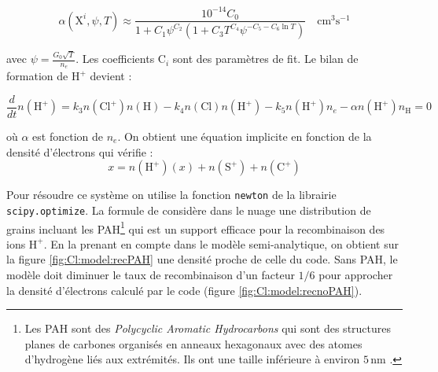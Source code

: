 \begin{equation}
    \alpha \left(\mathrm{X}^{i}, \psi, T\right) \approx \frac{10^{-14} C_{0} }{1+C_{1} \psi^{C_{2}}\left(1+C_{3} T^{C_{4}} \psi^{-C_{5}-C_{6} \ln T}\right)} \quad \mathrm{cm}^{3} \mathrm{s}^{-1}
\end{equation}

avec $\psi = \frac{G_0 \sqrt{T}}{n_e}$. Les coefficients $\mathrm{C}_i$ sont des paramètres de fit. Le bilan de formation de $\mathrm{H}^+$ devient : 

\begin{equation}\label{eq:h+}
    \frac{d}{dt}n(\mathrm{H}^+) = k_3n(\mathrm{Cl}^+)n(\mathrm{H}) - k_4n(\mathrm{Cl})n(\mathrm{H}^+) - k_5 n(\mathrm{H}^+)n_e -\alpha n(\mathrm{H}^+)n_{\mathrm{H}} = 0
\end{equation}

où $\alpha$ est fonction de $n_e$. On obtient une équation implicite en fonction de la densité d'électrons qui vérifie :
\begin{equation}
    x = n(\mathrm{H}^+)(x) + n(\mathrm{S}^+)  + n(\mathrm{C}^+)
\end{equation}

Pour résoudre ce système on utilise la fonction \texttt{newton} de la librairie \texttt{scipy.optimize}. La formule de \cite{Weingartner_2001} considère dans le nuage une distribution de grains incluant les PAH\footnote{Les PAH sont des \textit{Polycyclic Aromatic Hydrocarbons} qui sont des structures planes de carbones organisés en anneaux hexagonaux avec des atomes d'hydrogène liés aux extrémités. Ils ont une taille inférieure à environ $5\,\mathrm{nm}$ \cite{DraineBook}.} qui est un support efficace pour la recombinaison des ions $\mathrm{H}^+$. En la prenant en compte dans le modèle semi-analytique, on obtient sur la figure \ref{fig:Cl:model:recPAH} une densité proche de celle du code. Sans PAH, le modèle doit diminuer le taux de recombinaison d'un facteur $1/6$ pour approcher la densité d'électrons calculé par le code (figure \ref{fig:Cl:model:recnoPAH}).



